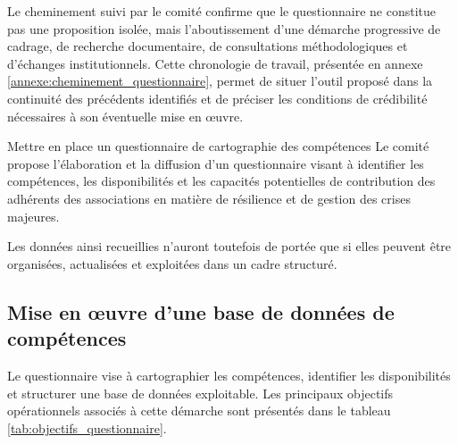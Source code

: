 Le cheminement suivi par le comité confirme que le questionnaire ne constitue pas une proposition isolée, mais l'aboutissement d'une démarche progressive de cadrage, de recherche documentaire, de consultations méthodologiques et d'échanges institutionnels. Cette chronologie de travail, présentée en annexe \ref{annexe:cheminement_questionnaire}, permet de situer l'outil proposé dans la continuité des précédents identifiés et de préciser les conditions de crédibilité nécessaires à son éventuelle mise en \oe{}uvre.

\begin{subproposition}{Mettre en place un questionnaire de cartographie des compétences}
Le comité propose l'élaboration et la diffusion d'un questionnaire visant à identifier les compétences, les disponibilités et les capacités potentielles de contribution des adhérents des associations en matière de résilience et de gestion des crises majeures.
\end{subproposition}

Les données ainsi recueillies n'auront toutefois de portée que si elles peuvent être organisées, actualisées et exploitées dans un cadre structuré.

\clearpage

\subsection{Mise en \oe{}uvre d'une base de données de compétences}

Le questionnaire vise à cartographier les compétences, identifier les disponibilités et structurer une base de données exploitable. Les principaux objectifs opérationnels associés à cette démarche sont présentés dans le tableau \ref{tab:objectifs_questionnaire}.

